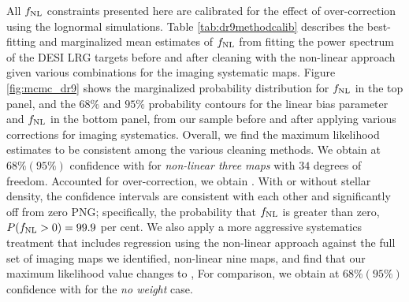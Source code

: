 All $f_{\rm NL}$ constraints presented here are calibrated for the effect of over-correction using the lognormal simulations. Table \ref{tab:dr9methodcalib} describes the best-fitting and marginalized mean estimates of $f_{\rm NL}$ from fitting the power spectrum of the DESI LRG targets before and after cleaning with the non-linear approach given various combinations for the imaging systematic maps. Figure \ref{fig:mcmc_dr9} shows the marginalized probability distribution for $f_{\rm NL}$ in the top panel, and the $68\%$ and $95\%$ probability contours for the linear bias parameter and $f_{\rm NL}$ in the bottom panel, from our sample before and after applying various corrections for imaging systematics. Overall, we find the maximum likelihood estimates to be consistent among the various cleaning methods. We obtain  at $68\%(95\%)$ confidence with  for \textit{non-linear three maps} with $34$ degrees of freedom. Accounted for over-correction, we obtain . With or without stellar density, the confidence intervals are consistent with each other and significantly off from zero PNG; specifically, the probability that $f_{\rm NL}$ is greater than zero, $P(f_{\rm NL} >0)=99.9$ per cent. We also apply a more aggressive systematics treatment that includes regression using the non-linear approach against the full set of imaging maps we identified, non-linear nine maps, and find that  our maximum likelihood value changes  to ,   For comparison, we obtain  at $68\% (95\%)$ confidence with  for the \textit{no weight} case.

